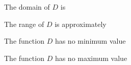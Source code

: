 \documentclass{ximera}
\begin{document}
\begin{example}
\begin{question}
The domain of $D$ is

\begin{multipleChoice}
  \choice {$[-8,3) \cup (3,8]$}
  \choice [correct]{$[-8,8]$}
\end{multipleChoice}
\end{question}





\begin{question}
The range of $D$ is approximately

\begin{multipleChoice}
  \choice {$[0.97, 8]$}
  \choice {$(-2.43, 8]$}
  \choice [correct]{$(-2.43, 6.38] \cup \{ 8 \}$}
\end{multipleChoice}
\end{question}



\begin{question}
The function $D$ has no minimum value
\begin{multipleChoice}
\end{multipleChoice}
\end{question}


\begin{question}
The function $D$ has no maximum value
\begin{multipleChoice}
\end{multipleChoice}
\end{question}




\end{example}
\end{document}

